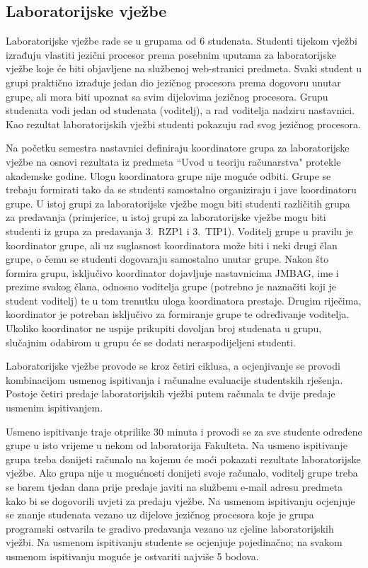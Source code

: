\documentclass[times, 12pt, utf8]{book}
\begin{document}
\subsection*{Laboratorijske vježbe}

Laboratorijske vježbe rade se u grupama od 6 studenata.
Studenti tijekom vježbi izrađuju vlastiti jezični procesor prema posebnim uputama za laboratorijske vježbe koje će biti objavljene na službenoj web-stranici predmeta.
Svaki student u grupi praktično izrađuje jedan dio jezičnog procesora prema dogovoru unutar grupe, ali mora biti upoznat sa svim dijelovima jezičnog procesora.
Grupu studenata vodi jedan od studenata (voditelj), a rad voditelja nadziru nastavnici.
Kao rezultat laboratorijskih vježbi studenti pokazuju rad svog jezičnog procesora.

Na početku semestra nastavnici definiraju koordinatore grupa za laboratorijske vježbe na osnovi rezultata iz predmeta ``Uvod u teoriju računarstva" protekle akademske godine.
Ulogu koordinatora grupe nije moguće odbiti.
Grupe se trebaju formirati tako da se studenti samostalno organiziraju i jave koordinatoru grupe.
U istoj grupi za laboratorijske vježbe mogu biti studenti različitih grupa za predavanja (primjerice, u istoj grupi za laboratorijske vježbe mogu biti studenti iz grupa za predavanja 3.~RZP1 i 3.~TIP1).
Voditelj grupe u pravilu je koordinator grupe, ali uz suglasnost koordinatora može biti i neki drugi član grupe, o čemu se studenti dogovaraju samostalno unutar grupe.
Nakon što formira grupu, isključivo koordinator dojavljuje nastavnicima JMBAG, ime i prezime svakog člana, odnosno voditelja grupe (potrebno je naznačiti koji je student voditelj) te u tom trenutku uloga koordinatora prestaje.
Drugim riječima, koordinator je potreban isključivo za formiranje grupe te određivanje voditelja.
Ukoliko koordinator ne uspije prikupiti dovoljan broj studenata u grupu, slučajnim odabirom u grupu će se dodati neraspodijeljeni studenti. 

Laboratorijske vježbe provode se kroz četiri ciklusa, a ocjenjivanje se provodi kombinacijom usmenog ispitivanja i računalne evaluacije studentskih rješenja.
Postoje četiri predaje laboratorijskih vježbi putem računala te dvije predaje usmenim ispitivanjem.

Usmeno ispitivanje traje otprilike 30 minuta i provodi se za sve studente određene grupe u isto vrijeme u nekom od laboratorija Fakulteta.
Na usmeno ispitivanje grupa treba donijeti računalo na kojemu će moći pokazati rezultate laboratorijske vježbe.
Ako grupa nije u mogućnosti donijeti svoje računalo, voditelj grupe treba se barem tjedan dana prije predaje javiti na službenu e-mail adresu predmeta kako bi se dogovorili uvjeti za predaju vježbe.
Na usmenom ispitivanju ocjenjuje se znanje studenata vezano uz dijelove jezičnog procesora koje je grupa programski ostvarila te gradivo predavanja vezano uz cjeline laboratorijskih vježbi.
Na usmenom ispitivanju studente se ocjenjuje pojedinačno; na svakom usmenom ispitivanju moguće je ostvariti najviše 5 bodova.
\end{document}
